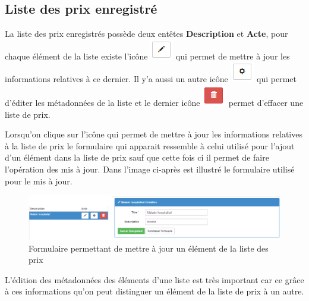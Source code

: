 \documentclass[12pt,a4paper]{report}
\begin{document}
\subsection{Liste des prix enregistré}

La liste des prix enregistrés possède deux entêtes \textbf{Description} et \textbf{Acte}, pour chaque élément de la liste existe l'icône \includegraphics[scale=0.7]{pic/EditBlack.png}  qui permet de mettre à jour les informations relatives à ce dernier. Il y'a aussi un autre icône  \includegraphics[scale=0.7]{pic/UpdateBlack.png} qui permet d'éditer les métadonnées de la liste et le dernier icône \includegraphics[scale=0.7]{pic/DeleteRed.png}  permet d'effacer une liste de prix.

Lorsqu'on clique sur l'icône qui permet de mettre à jour les informations relatives à la liste de prix le formulaire qui apparait ressemble à celui utilisé pour l'ajout d'un élément dans la liste de prix sauf que cette fois ci il permet de faire l'opération des mis à jour.
Dans l'image ci-après est illustré le formulaire utilisé pour le mis à jour.

\begin{figure}[h]
\begin{center}
\includegraphics[width=14cm]{pic/FormUpdateListePrice.png}
\end{center}
\caption{Formulaire permettant de mettre à jour un élément de la liste des prix}
\label{Formulaire permettant de mettre à jour un élément de la liste des prix}
\end{figure}

L'édition des métadonnées des éléments d'une liste est très important car ce grâce à ces informations qu'on peut distinguer un élément de la liste de prix à un autre.
\end{document}
